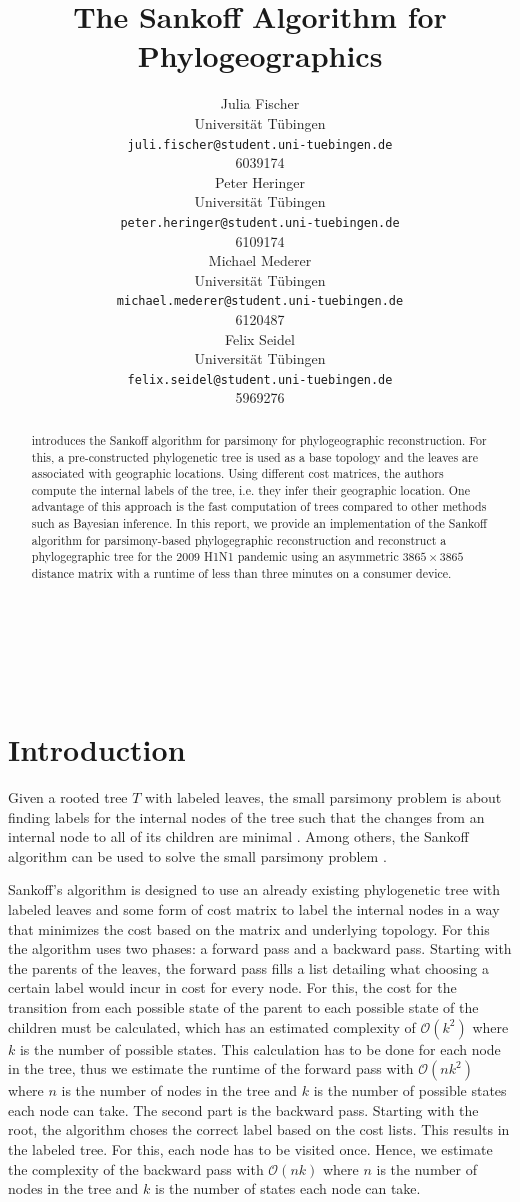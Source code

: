 \documentclass{article}
\title{The Sankoff Algorithm for Phylogeographics}
\author{
  Julia Fischer \\
  Universität Tübingen \\
  \texttt{juli.fischer@student.uni-tuebingen.de} \\
  6039174 \\
  \And
  Peter Heringer \\
  Universität Tübingen \\
  \texttt{peter.heringer@student.uni-tuebingen.de} \\
  6109174 \\
  \And 
  Michael Mederer \\
  Universität Tübingen \\
  \texttt{michael.mederer@student.uni-tuebingen.de} \\
  6120487 \\
  \And 
  Felix Seidel \\
  Universität Tübingen \\
  \texttt{felix.seidel@student.uni-tuebingen.de} \\
  5969276 \\
}
\begin{document}
\maketitle

 \ \\
\begin{abstract}
\cite{reimeringPhylogeographicReconstructionUsing2020} introduces the Sankoff
algorithm for parsimony for phylogeographic reconstruction. For this, a
pre-constructed phylogenetic tree is used as a base topology and the leaves are
associated with geographic locations. Using different cost matrices, the authors
compute the internal labels of the tree, i.e. they infer their geographic
location. One advantage of this approach is the fast computation of trees
compared to other methods such as Bayesian inference. 
In this report, we provide an implementation of the Sankoff algorithm for
parsimony-based phylogegraphic reconstruction and reconstruct a phylogegraphic
tree for the 2009 H1N1 pandemic using an asymmetric $3865 \times 3865$ distance
matrix with a runtime of less than three minutes on a consumer device. 
\end{abstract}

\ \\
\section{Introduction}
Given a rooted tree $T$ with labeled leaves, the small parsimony problem is about
finding labels for the internal nodes of the tree such that the changes from an
internal node to all of its children are minimal
\cite{jonesIntroductionBioinformaticsAlgorithms2004}.
Among others, the Sankoff algorithm can be used to solve the small parsimony
problem \cite{sankoffMinimalMutationTrees1975}. 

Sankoff's algorithm is designed to use an already existing phylogenetic tree with labeled leaves and
some form of cost matrix to label the internal nodes in a way that minimizes the cost based on the
matrix and underlying topology. For this the algorithm uses two phases: a
forward pass and a backward pass.
Starting with the parents of the leaves, the forward pass fills a
list detailing what choosing a certain label would incur in
cost for every node. For this, the cost for the transition from each possible state of the
parent to each possible state of the children must be calculated, which has an
estimated complexity of $\mathcal{O}(k^2)$ where $k$ is the number of possible
states. This calculation has to be done for each node in the tree, thus we
estimate the runtime of the forward pass
with $\mathcal{O}(nk^2)$ where $n$ is the number of nodes in the tree and $k$ is
the number of possible states each node can take.
The second part is the backward pass. Starting with the root, the algorithm
choses the correct label based on the cost lists. This results in the labeled
tree. For this, each node has to be visited once. Hence, we estimate the
complexity of the backward pass with $\mathcal{O}(nk)$ where $n$ is the number of
nodes in the tree and $k$ is the number of states each node can take.
\end{document}
